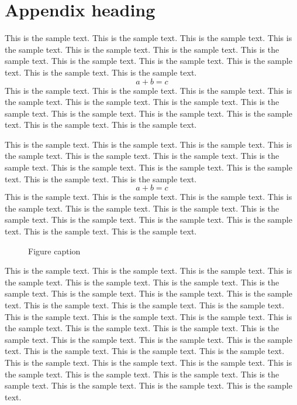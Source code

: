 \documentclass[preprint]{ptephy_v1}%
\begin{document}
\section{Appendix heading}
This is the sample text. This is the sample text. This is the sample text. This is the sample text.
This is the sample text. This is the sample text. This is the sample text. This is the sample text.
This is the sample text. This is the sample text. This is the sample text. This is the sample text.
\begin{equation}
a + b = c
\end{equation}
This is the sample text. This is the sample text. This is the sample text. This is the sample text.
This is the sample text. This is the sample text. This is the sample text. This is the sample text.
This is the sample text. This is the sample text. This is the sample text. This is the sample text.

This is the sample text. This is the sample text. This is the sample text. This is the sample text.
This is the sample text. This is the sample text. This is the sample text. This is the sample text.
This is the sample text. This is the sample text. This is the sample text. This is the sample text.
\begin{equation}
a + b = c
\end{equation}
This is the sample text. This is the sample text. This is the sample text. This is the sample text.
This is the sample text. This is the sample text. This is the sample text. This is the sample text.
This is the sample text. This is the sample text. This is the sample text. This is the sample text.

\begin{figure}[!h]
\caption{Figure caption}
\end{figure}

This is the sample text. This is the sample text. This is the sample text. This is the sample text.
This is the sample text. This is the sample text. This is the sample text. This is the sample text.
This is the sample text. This is the sample text. This is the sample text. This is the sample text.
This is the sample text. This is the sample text. This is the sample text. This is the sample text.
This is the sample text. This is the sample text. This is the sample text. This is the sample text.
This is the sample text. This is the sample text. This is the sample text. This is the sample text.
This is the sample text. This is the sample text. This is the sample text. This is the sample text.
This is the sample text. This is the sample text. This is the sample text. This is the sample text.
This is the sample text. This is the sample text. This is the sample text. This is the sample text.
\end{document}
